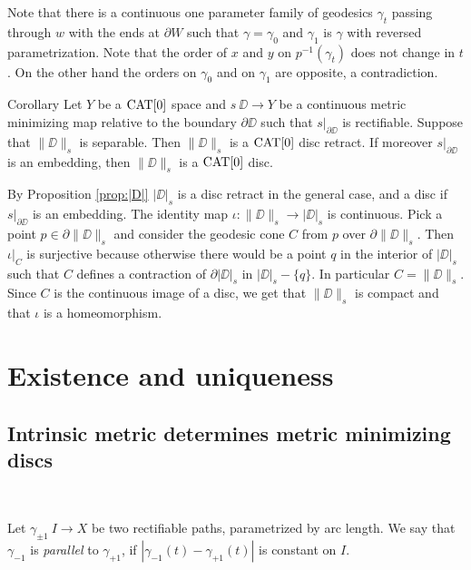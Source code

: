 \documentclass[a4paper,10pt]{amsart}
\begin{document}
Note that there is a continuous one parameter family of geodesics $\gamma_t$ passing through $w$ with the ends at $\partial W$
such that $\gamma=\gamma_0$ and $\gamma_1$ is $\gamma$ with reversed parametrization.
Note that the order of $x$ and $y$ on $p^{-1}(\gamma_t)$ does not change in $t$.
On the other hand the orders on $\gamma_0$ and on $\gamma_1$ are opposite, a contradiction.\qeds 

\begin{thm}{Corollary}\label{cor:main}
Let $Y$ be a $\mathop{\rm CAT}\nolimits[0]$ space 
and $s\:\DD\to Y$ be a continuous metric minimizing map relative to the boundary $\partial\DD$ such that $s|_{\partial\DD}$ is rectifiable.
Suppose that $\|\DD\|_s$  is separable. Then $\|\DD\|_s$ is a $\mathop{\rm CAT}\nolimits[0]$ disc retract. If moreover  $s|_{\partial\DD}$ is an embedding,
then $\|\DD\|_s$ is a $\mathop{\rm CAT}\nolimits[0]$ disc.
\end{thm}

By Proposition \ref{prop:|D|} $|\DD|_s$ is a disc retract in the general case, and a disc if $s|_{\partial\DD}$ is an embedding.
The identity map $\iota:\|\DD\|_s\to |\DD|_s$ is continuous. Pick a point $p\in\partial\|\DD\|_s$ and consider the geodesic 
cone $C$ from $p$ over $\partial\|\DD\|_s$. Then $\iota|_C$ is surjective because otherwise there would be a point $q$ in the 
interior of $|\DD|_s$ such that $C$ defines a contraction of $\partial|\DD|_s$ in $|\DD|_s-\{q\}$. In particular $C=\|\DD\|_s$.
Since $C$ is the continuous image of a disc, we get that $\|\DD\|_s$ is compact and that $\iota$ is a homeomorphism.
\qeds













\section{Existence and uniqueness}




\subsection{Intrinsic metric determines metric minimizing discs}~

\medskip
Let $\gamma_{\pm 1}\:I\to X$ be two rectifiable paths, parametrized by arc length. We say that  $\gamma_{-1}$ is {\em parallel} to $\gamma_{+1}$, if $|\gamma_{-1}(t)-\gamma_{+1}(t)|$
is constant on $I$.
\end{document}
